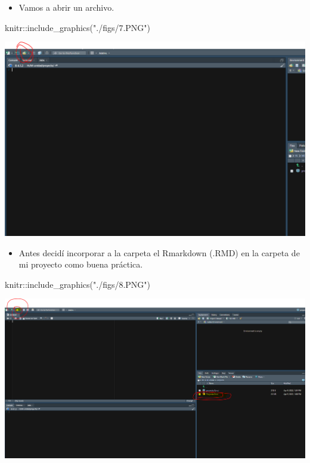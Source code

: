 \documentclass[
]{article}
\newenvironment{Shaded}{}{}
\newcommand{\FunctionTok}[1]{\textcolor[rgb]{0.02,0.16,0.49}{#1}}
\newcommand{\NormalTok}[1]{#1}
\newcommand{\SpecialCharTok}[1]{\textcolor[rgb]{0.25,0.44,0.63}{#1}}
\newcommand{\StringTok}[1]{\textcolor[rgb]{0.25,0.44,0.63}{#1}}
\providecommand{\tightlist}{%
  \setlength{\itemsep}{0pt}\setlength{\parskip}{0pt}}
\begin{document}
\begin{itemize}
\tightlist
\item
  Vamos a abrir un archivo.
\end{itemize}

\begin{Shaded}
\begin{Highlighting}[]
\NormalTok{knitr}\SpecialCharTok{::}\FunctionTok{include\_graphics}\NormalTok{(}\StringTok{"./figs/7.PNG"}\NormalTok{)}
\end{Highlighting}
\end{Shaded}

\begin{center}\includegraphics[width=0.6\linewidth]{./figs/7} \end{center}

\begin{itemize}
\tightlist
\item
  Antes decidí incorporar a la carpeta el Rmarkdown (.RMD) en la carpeta
  de mi proyecto como buena práctica.
\end{itemize}

\begin{Shaded}
\begin{Highlighting}[]
\NormalTok{knitr}\SpecialCharTok{::}\FunctionTok{include\_graphics}\NormalTok{(}\StringTok{"./figs/8.PNG"}\NormalTok{)}
\end{Highlighting}
\end{Shaded}

\begin{center}\includegraphics[width=0.6\linewidth]{./figs/8} \end{center}
\end{document}
